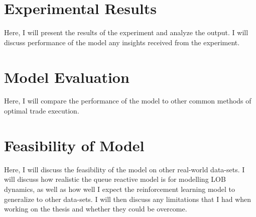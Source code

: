 \section{Experimental Results}
Here, I will present the results of the experiment and analyze the output. I will discuss performance of the model any insights received from the experiment.
\section{Model Evaluation}
Here, I will compare the performance of the model to other common methods of optimal trade execution.
\section{Feasibility of Model}
Here, I will discuss the feasibility of the model on other real-world data-sets. I will discuss how realistic the queue reactive model is for modelling LOB dynamics, as well as how well I expect the reinforcement learning model to generalize to other data-sets. I will then discuss any limitations that I had when working on the thesis and whether they could be overcome.
